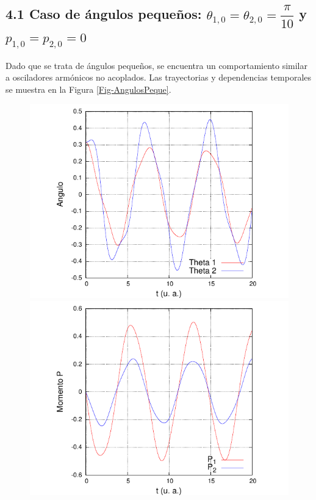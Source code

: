 \documentclass[10pt,letterpaper]{article}
\begin{document}
\subsection*{4.1 Caso de ángulos pequeños: $\theta_{1,0} = \theta_{2,0} = \dfrac{\pi}{10}$ y $p_{1,0} = p_{2,0} = 0$}
Dado que se trata de ángulos pequeños, se encuentra un comportamiento similar a osciladores armónicos no acoplados. Las trayectorias y dependencias temporales se muestra en la Figura \ref{Fig-AngulosPeque}.
\begin{figure}
\centering
\includegraphics[scale=0.9]{SGrafica_Theta_Tiempo.pdf}
\includegraphics[scale=0.9]{SGrafica_P_Tiempo.pdf}

\end{figure}
\end{document}
